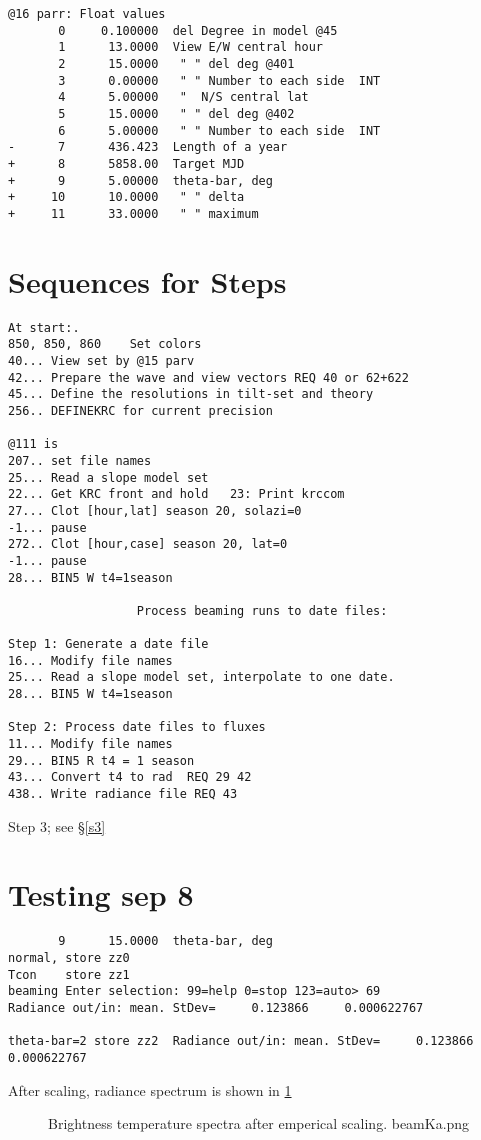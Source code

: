 \documentclass{article}
\begin{document}
\begin{verbatim}
@16 parr: Float values 
       0     0.100000  del Degree in model @45
       1      13.0000  View E/W central hour
       2      15.0000   " " del deg @401
       3      0.00000   " " Number to each side  INT
       4      5.00000   "  N/S central lat
       5      15.0000   " " del deg @402
       6      5.00000   " " Number to each side  INT
-      7      436.423  Length of a year
+      8      5858.00  Target MJD
+      9      5.00000  theta-bar, deg
+     10      10.0000   " " delta
+     11      33.0000   " " maximum
\end{verbatim}  

\section{Sequences for Steps}
\vspace{-3.mm} 
\begin{verbatim}
At start:.
850, 850, 860    Set colors
40... View set by @15 parv
42... Prepare the wave and view vectors REQ 40 or 62+622
45... Define the resolutions in tilt-set and theory 
256.. DEFINEKRC for current precision 

@111 is
207.. set file names
25... Read a slope model set
22... Get KRC front and hold   23: Print krccom
27... Clot [hour,lat] season 20, solazi=0
-1... pause
272.. Clot [hour,case] season 20, lat=0
-1... pause
28... BIN5 W t4=1season

                  Process beaming runs to date files:

Step 1: Generate a date file
16... Modify file names
25... Read a slope model set, interpolate to one date.
28... BIN5 W t4=1season

Step 2: Process date files to fluxes
11... Modify file names
29... BIN5 R t4 = 1 season
43... Convert t4 to rad  REQ 29 42
438.. Write radiance file REQ 43

\end{verbatim}
 Step 3; see \S \ref{s3}


\section{Testing sep 8}
\vspace{-3.mm} 
\begin{verbatim}
       9      15.0000  theta-bar, deg
normal, store zz0
Tcon    store zz1
beaming Enter selection: 99=help 0=stop 123=auto> 69
Radiance out/in: mean. StDev=     0.123866     0.000622767

theta-bar=2 store zz2  Radiance out/in: mean. StDev=     0.123866   0.000622767
\end{verbatim} 
After scaling, radiance spectrum is shown in 
\ref{beamKa}
\begin{figure}[!ht] 
\caption[First try]{Brightness temperature spectra after emperical scaling.
\label{beamKa} beamKa.png  }
\end{figure} 
\end{document}
